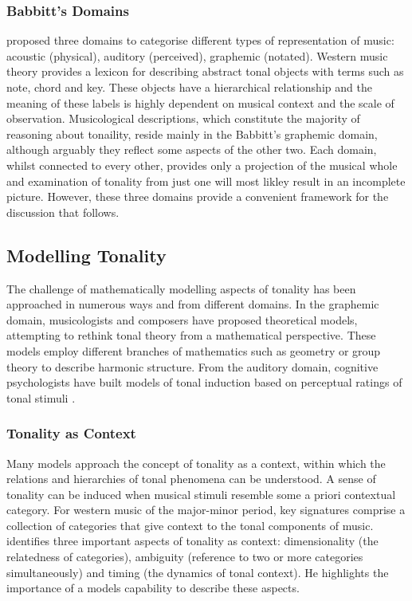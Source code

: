 \documentclass{article}
\begin{document}
\subsubsection{Babbitt's Domains}
\label{sec-2-1-2}

\citet{Babbitt1965} proposed three domains to categorise different
types of representation of music: acoustic (physical), auditory
(perceived), graphemic (notated). Western music theory provides a
lexicon for describing abstract tonal objects with terms such as note,
chord and key. These objects have a hierarchical relationship and the
meaning of these labels is highly dependent on musical context and the
scale of observation. Musicological descriptions, which constitute the
majority of reasoning about tonaility, reside mainly in the Babbitt's
graphemic domain, although arguably they reflect some aspects of the
other two. Each domain, whilst connected to every other, provides only
a projection of the musical whole and examination of tonality from
just one will most likley result in an incomplete picture. However,
these three domains provide a convenient framework for the discussion
that follows.
\subsection{Modelling Tonality}
\label{sec-2-2}

The challenge of mathematically modelling aspects of tonality has been
approached in numerous ways and from different domains. In the
graphemic domain, musicologists and composers have proposed
theoretical models, attempting to rethink tonal theory from a
mathematical perspective. These models employ different branches of
mathematics such as geometry \citep{Tymoczko2012} or group theory
\citep{Ring2011} to describe harmonic structure. From the auditory
domain, cognitive psychologists have built models of tonal induction
based on perceptual ratings of tonal stimuli \citep{Krumhansl1990}.
\subsubsection{Tonality as Context}
\label{sec-2-2-1}

Many models approach the concept of tonality as a context, within
which the relations and hierarchies of tonal phenomena can be
understood. A sense of tonality can be induced when musical stimuli
resemble some a priori contextual category. For western music of the
major-minor period, key signatures comprise a collection of categories
that give context to the tonal components of
music. \citet{Martorell2013} identifies three important aspects of
tonality as context: dimensionality (the relatedness of categories),
ambiguity (reference to two or more categories simultaneously) and
timing (the dynamics of tonal context). He highlights the importance
of a models capability to describe these aspects.
\end{document}
